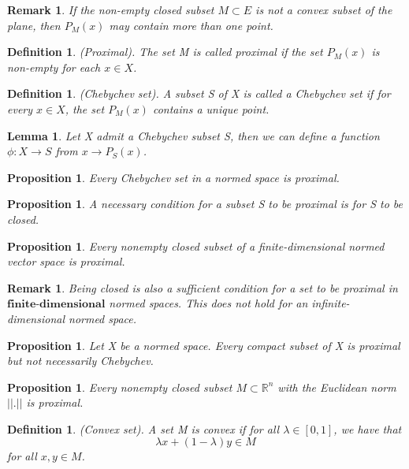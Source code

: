 \documentclass[twoside]{article}
\newtheorem{lemma}[theorem]{Lemma}
\newtheorem{proposition}[theorem]{Proposition}
\newtheorem{definition}[theorem]{Definition}
\newtheorem{remark}[theorem]{Remark}
\begin{document}
\begin{remark}If the non-empty closed subset $M \subset E$ is not a convex subset of the plane, then $P_M(x)$ may contain more than one point.
\end{remark}

\begin{definition}(Proximal). The set M is called proximal if the set $P_M(x)$ is non-empty for each $x \in X$.
\end{definition}

\begin{definition}(Chebychev set). A subset S of X is called a Chebychev set if for every $x \in X$, the set $P_M(x)$ contains a unique point.
\end{definition}

\begin{lemma}Let X admit a Chebychev subset S, then we can define a function $\phi:X \rightarrow S$ from $x \rightarrow P_S(x)$.
\end{lemma}

\begin{proposition}Every Chebychev set in a normed space is proximal.
\end{proposition}

\begin{proposition}A necessary condition for a subset S to be proximal is for S to be closed.
\end{proposition}

\begin{proposition}Every nonempty closed subset of a finite-dimensional normed vector space is proximal.
\end{proposition}

\begin{remark}Being closed is also a sufficient condition for a set to be proximal in $\textbf{finite-dimensional}$ normed spaces. This does not hold for an infinite-dimensional normed space.
\end{remark}

\begin{proposition}Let X be a normed space. Every compact subset of X is proximal but not necessarily Chebychev.
\end{proposition}

\begin{proposition}Every nonempty closed subset $M \subset \mathbb{R}^n$ with the Euclidean norm $||.||$ is proximal.
\end{proposition}

\begin{definition}(Convex set). A set M is convex if for all $\lambda \in [0,1]$, we have that 
$$
\lambda x + (1-\lambda)y \in M
$$
for all $x,y \in M$.
\end{definition}
\end{document}
